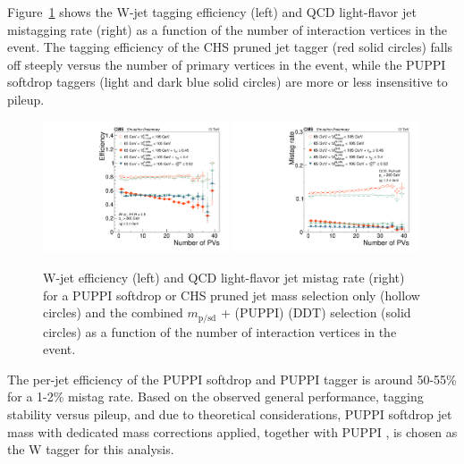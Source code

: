 Figure~\ref{fig:searchII:effvspu} shows the W-jet tagging efficiency (left) and QCD light-flavor jet mistagging rate (right) as a function of the number of interaction vertices in the event. The tagging efficiency of the CHS pruned jet tagger (red solid circles) falls off steeply versus the number of primary vertices in the event, while the PUPPI softdrop taggers (light and dark blue solid circles) are more or less insensitive to pileup.
\begin{figure}[h!]
\centering
\includegraphics[width=0.49\textwidth]{figures/vtagging/JME-16-003/BoostedW/WtagSigEffvsNPV.pdf}
\includegraphics[width=0.49\textwidth]{figures/vtagging/JME-16-003/BoostedW/QCDBkgEffvsNPV.pdf}
\caption{W-jet efficiency (left) and QCD light-flavor jet mistag rate (right) for a PUPPI softdrop or CHS pruned jet mass selection only (hollow circles) and the combined $m_{\mathrm{p/sd}}$ + (PUPPI) \nsubj (DDT) selection (solid circles) as a function of the number of interaction vertices in the event.}
\label{fig:searchII:effvspu}
\end{figure}
The per-jet efficiency of the PUPPI softdrop and PUPPI \nsubj tagger is around 50-55\% for a 1-2\% mistag rate. Based on the observed general performance, tagging stability versus pileup, and due to theoretical considerations, PUPPI softdrop jet mass with dedicated mass corrections applied, together with PUPPI \nsubj, is chosen as the W tagger for this analysis.

